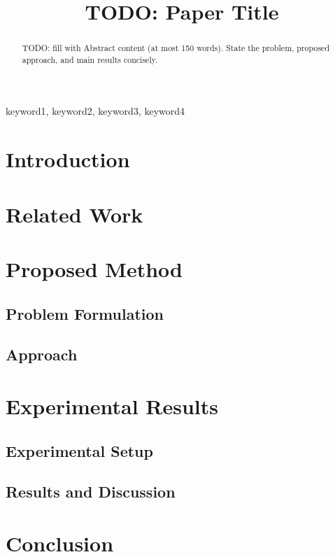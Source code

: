\documentclass[conference]{IEEEtran}
\title{TODO: Paper Title}
\author{%
  \IEEEauthorblockN{Anonymous Author}
  \IEEEauthorblockA{%
    \textit{Anonymous Institution}\\
    City, Country\\
    email@example.com
  }
}
\begin{document}
\maketitle

\begin{abstract}
TODO: fill with Abstract content (at most 150 words). State the problem, proposed approach, and main results concisely.
\end{abstract}

\begin{IEEEkeywords}
keyword1, keyword2, keyword3, keyword4
\end{IEEEkeywords}

\section{Introduction}

\section{Related Work}

\section{Proposed Method}

\subsection{Problem Formulation}

\subsection{Approach}

\section{Experimental Results}

\subsection{Experimental Setup}

\subsection{Results and Discussion}

\section{Conclusion}



\end{document}
